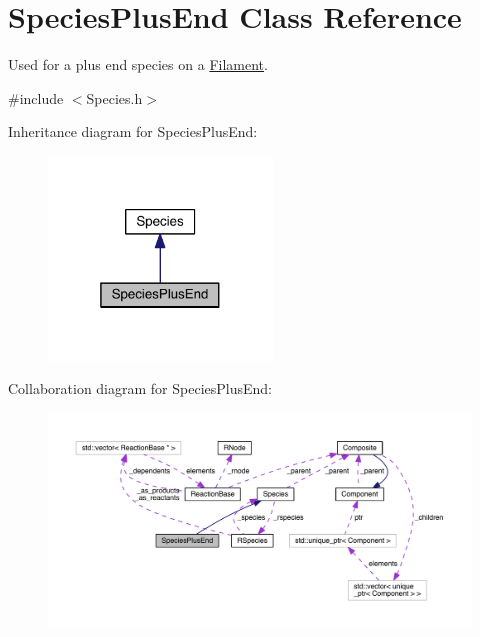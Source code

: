 \hypertarget{classSpeciesPlusEnd}{\section{Species\+Plus\+End Class Reference}
\label{classSpeciesPlusEnd}
}


Used for a plus end species on a \hyperlink{classFilament}{Filament}.  




{\ttfamily \#include $<$Species.\+h$>$}



Inheritance diagram for Species\+Plus\+End\+:\nopagebreak
\begin{figure}[H]
\begin{center}
\leavevmode
\includegraphics[width=169pt]{classSpeciesPlusEnd__inherit__graph}
\end{center}
\end{figure}


Collaboration diagram for Species\+Plus\+End\+:\nopagebreak
\begin{figure}[H]
\begin{center}
\leavevmode
\includegraphics[width=350pt]{classSpeciesPlusEnd__coll__graph}
\end{center}
\end{figure}
